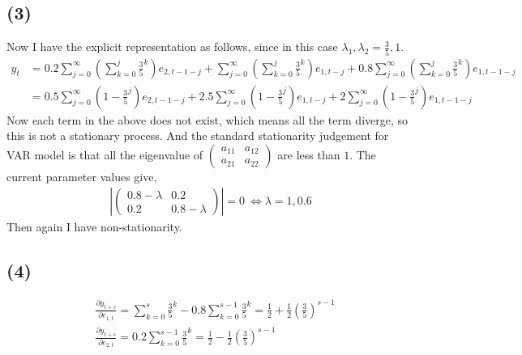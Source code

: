 \documentclass{article}
\begin{document}
\subsection{(3)}
 Now I have the explicit representation as follows, since in this case $\lambda_1, \lambda_2 = \frac{3}{5}, 1$.
\begin{align*}
	y_t &= 0.2 \sum_{j = 0}^{\infty} \left( \sum_{k = 0}^{j} \frac{3}{5}^{k} \right) e_{2, t-1-j}+\sum_{j = 0}^{\infty} \left( \sum_{k = 0}^{j} \frac{3}{5}^{k} \right) e_{1, t-j} + 0.8 \sum_{j = 0}^{\infty} \left( \sum_{k = 0}^{j} \frac{3}{5}^{k} \right) e_{1, t-1-j}\\[10pt]
	&= 0.5 \sum_{j = 0}^{\infty} \left( 1 - \frac{3}{5}^j\right) e_{2, t-1-j} + 2.5 \sum_{j = 0}^{\infty} \left( 1 - \frac{3}{5}^j\right) e_{1, t-j} + 2 \sum_{j = 0}^{\infty} \left( 1 - \frac{3}{5}^j\right) e_{1, t-1-j}
\end{align*}
Now each term in the above does not exist, which means all the term diverge, so this is not a stationary process. And the standard stationarity judgement for VAR model is that all the eigenvalue of $\begin{pmatrix} a_{11} & a_{12}\\a_{21} & a_{22} \end{pmatrix}$ are less than $1$. The current parameter values give,
\begin{align*}
	\left| \begin{pmatrix} 0.8-\lambda & 0.2\\0.2 & 0.8-\lambda \end{pmatrix} \right| = 0\ \Leftrightarrow \lambda = 1, 0.6
\end{align*}
Then again I have non-stationarity.

\subsection{(4)}
\begin{align*}
 &\frac{\partial y_{t+s}}{\partial e_{1, t}} = \sum_{k = 0}^{s} \frac{3}{5}^k - 0.8 \sum_{k = 0}^{s-1} \frac{3}{5}^k = \frac{1}{2} + \frac{1}{2} \left( \frac{3}{5} \right)^{s-1}\\[8pt]
 &\frac{\partial y_{t+s}}{\partial e_{2, t}} = 0.2 \sum_{k = 0}^{s-1} \frac{3}{5}^k = \frac{1}{2} -\frac{1}{2} \left( \frac{3}{5}\right)^{s-1}
\end{align*}
\end{document}
